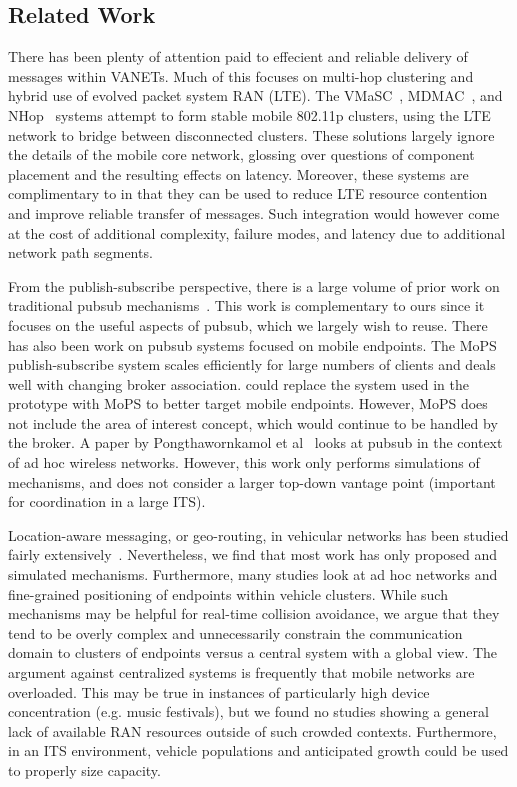 \subsection{Related Work}

There has been plenty of attention paid to effecient and reliable
delivery of messages within VANETs.  Much of this focuses on multi-hop
clustering and hybrid use of evolved packet system RAN (LTE).  The
VMaSC~\cite{ucar2016multihop}, MDMAC~\cite{wolny2008modified}, and
NHop~\cite{zhang2011novel} systems attempt to form stable mobile
802.11p clusters, using the LTE network to bridge between disconnected
clusters. These solutions largely ignore the details of the mobile
core network, glossing over questions of component placement and the
resulting effects on latency. Moreover, these systems are
complimentary to \name{} in that they can be used to reduce LTE
resource contention and improve reliable transfer of messages. Such
integration would however come at the cost of additional complexity,
failure modes, and latency due to additional network path segments.

From the publish-subscribe perspective, there is a large volume of
prior work on traditional pubsub mechanisms~\cite{ps1,ps2,ps3,ps4}.
This work is complementary to ours since it focuses on the useful
aspects of pubsub, which we largely wish to reuse. There has also been
work on pubsub systems focused on mobile endpoints. The
MoPS~\cite{nasim2014mobile} publish-subscribe system scales
efficiently for large numbers of clients and deals well with changing
broker association.  \name{} could replace the \pubsub system used in
the prototype with MoPS to better target mobile endpoints. However,
MoPS does not include the area of interest concept, which would
continue to be handled by the \name{} broker. A paper by
Pongthawornkamol et al~\cite{pongthawornkamol2007analysis} looks at
pubsub in the context of ad hoc wireless networks. However, this work
only performs simulations of mechanisms, and does not consider a
larger top-down vantage point (important for coordination in a large
ITS).

Location-aware messaging, or geo-routing, in vehicular networks has
been studied fairly extensively~\cite{bilal2013position}.
Nevertheless, we find that most work has only proposed and simulated
mechanisms. Furthermore, many studies look at ad hoc networks and
fine-grained positioning of endpoints within vehicle clusters.  While
such mechanisms may be helpful for real-time collision avoidance, we
argue that they tend to be overly complex and unnecessarily constrain
the communication domain to clusters of endpoints versus a central
system with a global view. The argument against centralized systems is
frequently that mobile networks are overloaded. This may be true in
instances of particularly high device concentration (e.g. music
festivals), but we found no studies showing a general lack of
available RAN resources outside of such crowded contexts.
Furthermore, in an ITS environment, vehicle populations and
anticipated growth could be used to properly size capacity.

